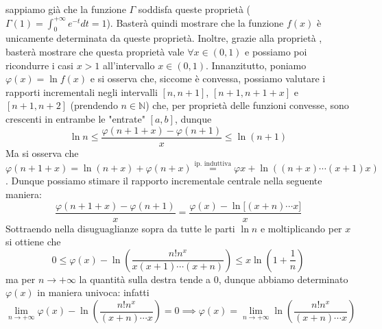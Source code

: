 \documentclass{report}
\begin{document}
\begin{myproof}
sappiamo già che la funzione $\Gamma$ soddisfa queste proprietà ($\Gamma(1) = \int_{0}^{+\infty} e^{-t}dt = 1$). Basterà quindi mostrare che la funzione $f(x)$ è unicamente determinata da queste proprietà. Inoltre, grazie alla proprietà , basterà mostrare che questa proprietà vale $\forall x \in (0, 1)$ e possiamo poi ricondurre i casi $x > 1$ all'intervallo $x \in (0,1)$. Innanzitutto, poniamo $\varphi(x) = \ln{f(x)}$ e si osserva che, siccome è convessa, possiamo valutare i rapporti incrementali negli intervalli $[n, n+1]$, $[n+1, n+1+x]$ e $[n+1, n+2]$ (prendendo $n \in \mathbb{N}$) che, per proprietà delle funzioni convesse, sono crescenti in entrambe le "entrate" $[a, b]$, dunque
$$
	\ln{n} \leq \frac{\varphi(n+1+x) - \varphi(n+1)}{x} \leq \ln{(n+1)}
$$
Ma si osserva che $\varphi(n+1+x) = \ln{(n+x)} + \varphi(n+x) \stackrel{\text{ip. induttiva}}{=} \varphi{x} + \ln{((n+x) \cdots (x+1)x)}$. Dunque possiamo stimare il rapporto incrementale centrale nella seguente maniera:
$$
\frac{\varphi(n+1+x)-\varphi(n+1)}{x} = \frac{\varphi(x) - \ln{[(x+n) \cdots x}]}{x}
$$
Sottraendo nella disuguaglianze sopra da tutte le parti $\ln{n}$ e moltiplicando per $x$ si ottiene che
$$
0 \leq \varphi(x) - \ln{\left( \frac{n!n^x}{x(x+1)\cdots (x+n)} \right)} \leq x \ln{ \left( 1 + \frac{1}{n} \right)}
$$
ma per $n \to +\infty$ la quantità sulla destra tende a $0$, dunque abbiamo determinato $\varphi(x)$ in maniera univoca: infatti
$$
\lim_{n \to +\infty} \varphi(x) - \ln{\left(\frac{n!n^x}{(x+n)\cdots x} \right)} = 0 \implies \varphi(x) = \lim_{n \to +\infty} \ln{\left(\frac{n!n^x}{(x+n)\cdots x} \right)}
$$
\end{myproof}
\end{document}
